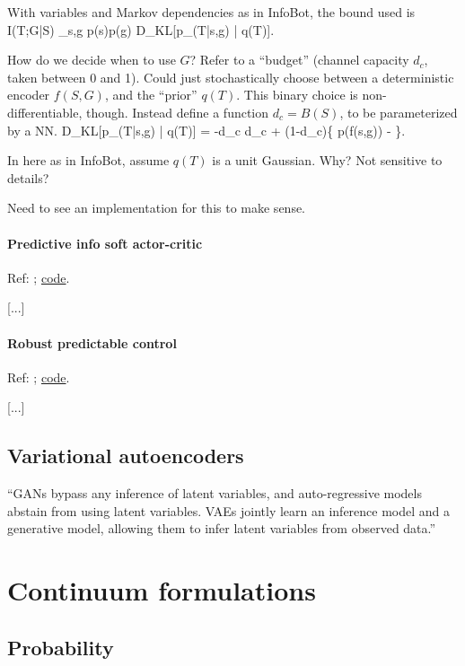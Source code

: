 \documentclass[notitlepage,openany,11pt]{report}
\theoremstyle{plain}%
\numberwithin{equation}{section}
\begin{document}
With variables and Markov dependencies as in InfoBot, the bound used is
\be
I(T;G|S) \leq \sum_{s,g} p(s)p(g) D_{KL}[p_{}(T|s,g) | q(T)].
\ee

How do we decide when to use $G$? Refer to a ``budget'' (channel capacity $d_c$, taken between 0 and 1). Could just stochastically choose between a deterministic encoder $f(S,G)$, and the ``prior'' $q(T)$. This binary choice is non-differentiable, though. Instead define a function $d_c = B(S)$, to be parameterized by a NN. 
\be
D_{KL}[p_{}(T|s,g) | q(T)] = -d_c \log d_c + (1-d_c)\left\{ \log p(f(s,g)) - \log [d_c p(f(s,g)) + (1-d_c)] \right\}.
\ee

In here as in InfoBot, assume $q(T)$ is a unit Gaussian. Why? Not sensitive to details?

Need to see an implementation for this to make sense.



\subsubsection{Predictive info soft actor-critic}
Ref: \cite{LeeEtAl:20}; \href{https://github.com/google-research/pisac}{code}.


[...]


\subsubsection{Robust predictable control}
Ref: \cite{EysenbachEtAl:21a}; \href{https://ben-eysenbach.github.io/rpc/}{code}.

[...]


\section{Variational autoencoders}

``GANs bypass any inference of latent variables, and auto-regressive models abstain from using latent variables. VAEs jointly learn an inference model and a generative model, allowing them to infer latent variables from observed data.''



\chapter{Continuum formulations}

\section{Probability}
\end{document}
